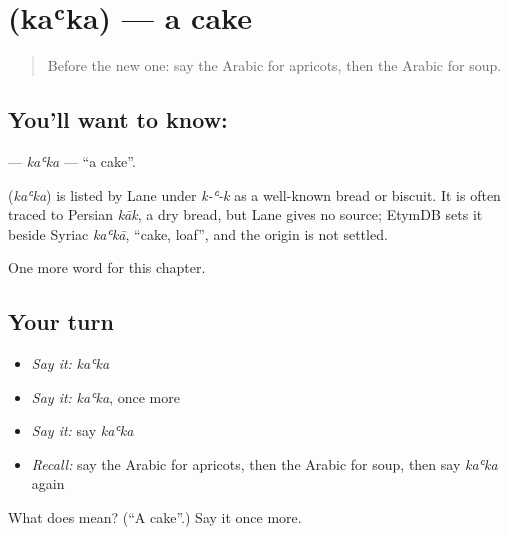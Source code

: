 \section[\texorpdfstring{\ar{كعكة} (kaʿka)}{كعكة (kaʿka)}]{ (kaʿka) — a cake}

\label{lesson:AR-C130-kaka}



\begin{quote}
Before the new one: say the Arabic for apricots, then the Arabic for soup.
\end{quote}

\subsection*{You'll want to know: }
\textbf{} — \emph{kaʿka} — \textquotedblleft{}a cake\textquotedblright{}.

\begin{cousinweb}
\textbf{} (\emph{kaʿka}) is listed by Lane under \emph{k-ʿ-k} as a well-known bread or biscuit. It is often traced to Persian \emph{kāk}, a dry bread, but Lane gives no source; EtymDB sets it beside Syriac \emph{kaʿkā}, \textquotedblleft{}cake, loaf\textquotedblright{}, and the origin is not settled.
\end{cousinweb}

\begin{grammarlens}[title={What you've built}]
One more word for this chapter.
\end{grammarlens}

\subsection*{Your turn}
\begin{itemize}
\raggedright
  \item \emph{Say it:} \emph{kaʿka}
  \item \emph{Say it:} \emph{kaʿka}, once more
  \item \emph{Say it:} say \emph{kaʿka}
  \item \emph{Recall:} say the Arabic for apricots, then the Arabic for soup, then say \emph{kaʿka} again
\end{itemize}

\begin{tcolorbox}[breakable,colback=teal!4,colframe=teal!35!black,title={Before you move on}]
What does  mean? (\textquotedblleft{}A cake\textquotedblright{}.) Say it once more.
\end{tcolorbox}
